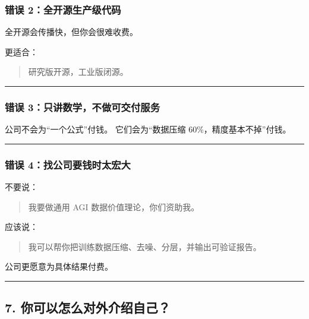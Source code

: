 \documentclass[
  12pt,
]{ctexart}
\begin{document}
\subsubsection{错误
2：全开源生产级代码}\label{ux9519ux8bef-2ux5168ux5f00ux6e90ux751fux4ea7ux7ea7ux4ee3ux7801}

全开源会传播快，但你会很难收费。

更适合：

\begin{quote}
研究版开源，工业版闭源。
\end{quote}

\begin{center}\rule{0.5\linewidth}{0.5pt}\end{center}

\subsubsection{错误
3：只讲数学，不做可交付服务}\label{ux9519ux8bef-3ux53eaux8bb2ux6570ux5b66ux4e0dux505aux53efux4ea4ux4ed8ux670dux52a1}

公司不会为``一个公式''付钱。 它们会为``数据压缩
60\%，精度基本不掉''付钱。

\begin{center}\rule{0.5\linewidth}{0.5pt}\end{center}

\subsubsection{错误
4：找公司要钱时太宏大}\label{ux9519ux8bef-4ux627eux516cux53f8ux8981ux94b1ux65f6ux592aux5b8fux5927}

不要说：

\begin{quote}
我要做通用 AGI 数据价值理论，你们资助我。
\end{quote}

应该说：

\begin{quote}
我可以帮你把训练数据压缩、去噪、分层，并输出可验证报告。
\end{quote}

公司更愿意为具体结果付费。

\begin{center}\rule{0.5\linewidth}{0.5pt}\end{center}

\subsection{7.
你可以怎么对外介绍自己？}\label{ux4f60ux53efux4ee5ux600eux4e48ux5bf9ux5916ux4ecbux7ecdux81eaux5df1}
\end{document}
